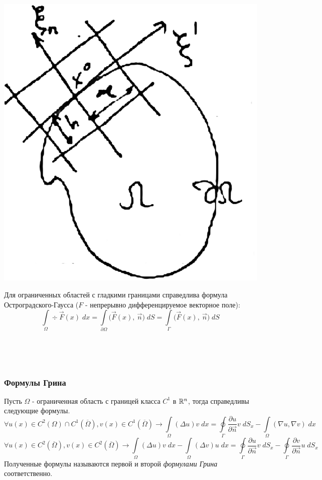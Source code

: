 \documentclass[../main.tex]{subfiles}
\begin{document}
\begin{minipage}{0.3\textwidth}
\begin{center}
\includegraphics[scale = 0.2]{14_1_new}
\end{center}
\end{minipage}
\begin{minipage}{0.8\textwidth}
Для ограниченных областей с гладкими границами справедлива формула Остроградского-Гаусса ($F$ - непрерывно дифференцируемое векторное поле):
$$\int\limits_{\Omega} \div \vec{F}(x)\;dx = \int\limits_{\partial \Omega} \bigl(\vec{F}(x),\: \vec{n}\bigr)\;dS = \int\limits_{\Gamma} \bigl(\vec{F}(x),\: \vec{n}\bigr)\;dS$$
\end{minipage} \\
\begin{lemma} \ \\
\subsubsection{Формулы Грина}
Пусть $\Omega$ - ограниченная область с границей класса $C^1$ в $\mathbb{R}^n$, тогда справедливы следующие формулы.
	$$\forall u(x) \in C^2(\Omega)\cap C^1(\overline{\Omega}), v(x) \in C^1(\overline{\Omega}) \to \int\limits_{\Omega} (\Delta u)v\; dx = \oint\limits_{\Gamma} \dfrac{\partial u}{\partial \vec{n}} v\;dS_x - \int\limits_{\Omega}(\nabla u, \nabla v)\;dx $$
$$ \forall u(x) \in C^2(\overline{\Omega}), v(x) \in C^2(\overline{\Omega}) \to \int\limits_{\Omega} (\Delta u)v\; dx - \int\limits_{\Omega} (\Delta v)u\; dx = \oint\limits_{\Gamma} \dfrac{\partial u}{\partial \vec{n}} v\;dS_x - \oint\limits_{\Gamma} \dfrac{\partial v}{\partial \vec{n}} u\;dS_x$$
Полученные формулы называются первой и второй\; \textit{формулами Грина} соответственно.
\end{lemma}
\end{document}
